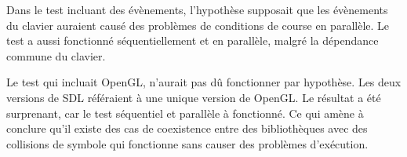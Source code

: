 Dans le test incluant des évènements, l'hypothèse supposait que les évènements du clavier
auraient causé des problèmes de conditions de course en parallèle. Le test a aussi fonctionné
séquentiellement et en parallèle, malgré la dépendance commune du clavier.

Le test qui incluait OpenGL, n'aurait pas dû fonctionner par hypothèse. Les deux versions
de SDL référaient à une unique version de OpenGL. Le résultat a été surprenant, car le test
séquentiel et parallèle à fonctionné. Ce qui amène à conclure qu'il existe des cas
de coexistence entre des bibliothèques avec des collisions de symbole qui fonctionne
sans causer des problèmes d'exécution.



%
%
%
